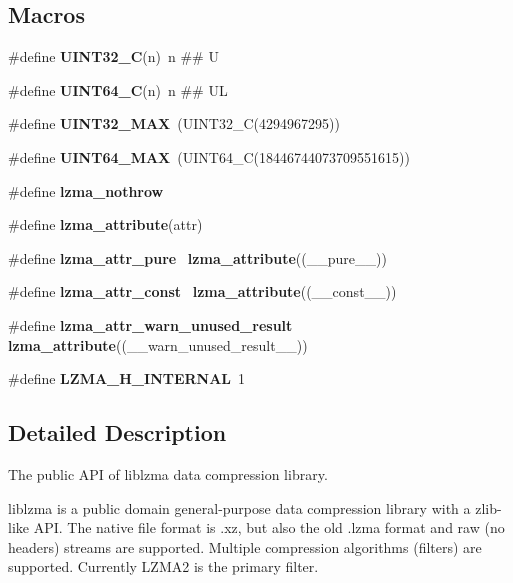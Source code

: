 \subsection*{Macros}
\begin{DoxyCompactItemize}
\item 
\mbox{\label{lzma_8h_acecee981dc3f28418f54035e20d7e578}} 
\#define {\bfseries U\+I\+N\+T32\+\_\+C}(n)~n \#\# U
\item 
\mbox{\label{lzma_8h_ac6548785b283106d4d7bfc7a4ef87fc4}} 
\#define {\bfseries U\+I\+N\+T64\+\_\+C}(n)~n \#\# UL
\item 
\mbox{\label{lzma_8h_ab5eb23180f7cc12b7d6c04a8ec067fdd}} 
\#define {\bfseries U\+I\+N\+T32\+\_\+\+M\+AX}~(U\+I\+N\+T32\+\_\+C(4294967295))
\item 
\mbox{\label{lzma_8h_a30654b4b67d97c42ca3f9b6052dda916}} 
\#define {\bfseries U\+I\+N\+T64\+\_\+\+M\+AX}~(U\+I\+N\+T64\+\_\+C(18446744073709551615))
\item 
\mbox{\label{lzma_8h_a55854429aba444dbb0bd8325fed4eece}} 
\#define {\bfseries lzma\+\_\+nothrow}
\item 
\mbox{\label{lzma_8h_a246aa54bb4e735e1e3054e65b51a6ed8}} 
\#define {\bfseries lzma\+\_\+attribute}(attr)
\item 
\mbox{\label{lzma_8h_adbc570ea8654f0c96699e38249ac8032}} 
\#define {\bfseries lzma\+\_\+attr\+\_\+pure}~\textbf{ lzma\+\_\+attribute}((\+\_\+\+\_\+pure\+\_\+\+\_\+))
\item 
\mbox{\label{lzma_8h_a0aaafb664f89a525ff22530d61704556}} 
\#define {\bfseries lzma\+\_\+attr\+\_\+const}~\textbf{ lzma\+\_\+attribute}((\+\_\+\+\_\+const\+\_\+\+\_\+))
\item 
\mbox{\label{lzma_8h_af15e147fcd7986ec4dd82660aec2b695}} 
\#define {\bfseries lzma\+\_\+attr\+\_\+warn\+\_\+unused\+\_\+result}~\textbf{ lzma\+\_\+attribute}((\+\_\+\+\_\+warn\+\_\+unused\+\_\+result\+\_\+\+\_\+))
\item 
\mbox{\label{lzma_8h_af828f75941ade54f8379bb847da37349}} 
\#define {\bfseries L\+Z\+M\+A\+\_\+\+H\+\_\+\+I\+N\+T\+E\+R\+N\+AL}~1
\end{DoxyCompactItemize}


\subsection{Detailed Description}
The public A\+PI of liblzma data compression library. 

liblzma is a public domain general-\/purpose data compression library with a zlib-\/like A\+PI. The native file format is .xz, but also the old .lzma format and raw (no headers) streams are supported. Multiple compression algorithms (filters) are supported. Currently L\+Z\+M\+A2 is the primary filter.

